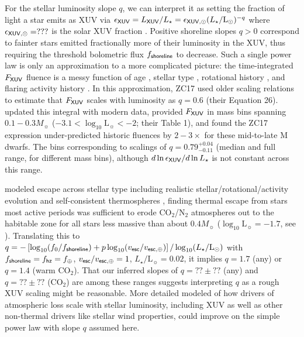 \documentclass[modern,linenumbers,trackchanges]{aastex7}
\begin{document}
For the stellar luminosity slope $q$, we can interpret it as setting the fraction of light a star emits as XUV via $\epsilon_{\sf XUV} = L_{\sf XUV}/L_{\star} = \epsilon_{\sf XUV, \odot} (L_\star/\mathrm{L_\odot})^{-q}$ where $\epsilon_{\sf XUV, \odot}=???$ is the solar XUV fraction \citep{woodsSolarIrradianceReference2009a}. Positive shoreline slopes $q > 0$ correspond to fainter stars emitted fractionally more of their luminosity in the XUV, thus requiring the threshold bolometric flux $f_{\sf shoreline}$ to decrease. Such a single power law is only an approximation to a more complicated picture: the time-integrated $F_{\sf XUV}$ fluence is a messy function of age \citep{ribasEvolutionSolarActivity2005, wrightSTELLARACTIVITYROTATIONRELATIONSHIPEVOLUTION2011, pinedaFarUltravioletMdwarf2021, duvvuriHighenergySpectrumYoung2023b, kingStellarXRayVariability2025}, stellar type \citep{linskyIntrinsicExtremeUltraviolet2014, richey-yowellHAZMATUltravioletXRay2019, peacockHAZMATVIEvolution2020, wilsonMegaMUSCLESTreasurySurvey2025b}, rotational history \citep{irwinMonitorProjectRotation2007, loydHAZMATVIIEvolution2021, johnstoneActiveLivesStars2021}, and flaring activity history  \citep{franceHighenergyRadiationEnvironment2020d, diamond-loweHighenergySpectrumNearby2021a, feinsteinAUMicroscopiiFarUV2022a}. In this approximation, ZC17 used older scaling relations to estimate that $F_{\sf XUV}$ scales with luminosity as $q=0.6$ (their Equation 26). \citet{passRecedingCosmicShoreline2025} updated this integral with modern data, provided $F_{\sf XUV}$ in mass bins spanning $0.1-0.3 M_\sun$ ($-3.1< \log_{10} \mathrm{L_\sun} < -2$; their Table 1), and found the ZC17 expression under-predicted historic fluences by $2-3\times$ for these mid-to-late M dwarfs. The \citet{passRecedingCosmicShoreline2025} bins corresponding to scalings of $q={0.79}^{+0.04}_{-0.11}$ (median and full range, for different mass bins), although $d\ln \epsilon_{\sf XUV}/d\ln L_\star$ is not constant across this range. 

\citet{vanlooverenHabitableZoneAtmosphere2025} modeled escape across stellar type including realistic stellar/rotational/activity evolution and self-consistent thermospheres \citep{johnstoneUpperAtmospheresTerrestrial2018}, finding thermal escape from stars most active periods was sufficient to erode CO$_2$/N$_2$ atmospheres out to the habitable zone for all stars less massive than about $0.4 M_\sun$ ($\log_{10} \mathrm{L_\sun} =-1.7$, see \citealt{pinedaMdwarfUltravioletSpectroscopic2021}). Translating this to $q = - \left[\log_{10} (f_0/f_{\sf shoreline}) + p \log_{10} (v_{\sf esc}/v_{\sf esc, \oplus})\right]/\log_{10} (L_\star/\mathrm{L_\odot})$ with $f_{\sf shoreline} = f_{\sf hz} = f_{\oplus}$, $v_{\sf esc}/v_{\sf esc, \oplus}=1$, $L_\star/\mathrm{L_\sun} = 0.02$, it implies $q = 1.7$ (any) or $q = 1.4$ (warm CO$_2$). That our inferred slopes of $q = ??\pm??$ (any) and $q = ??\pm??$ (CO$_2$) are among these ranges suggests interpreting $q$ as a rough XUV scaling might be reasonable. More detailed modeled of how drivers of atmospheric loss scale with stellar luminosity, including XUV as well as other non-thermal drivers like stellar wind properties, could improve on the simple power law with slope $q$ assumed here.
\end{document}
